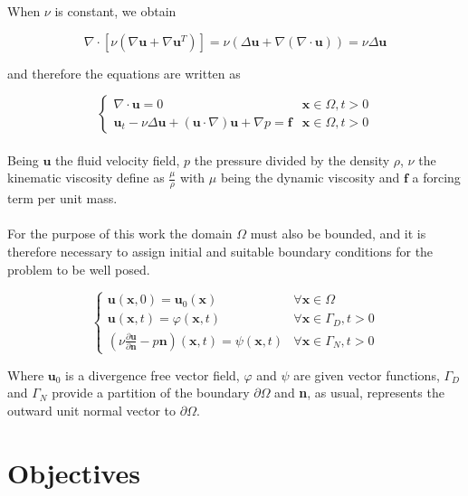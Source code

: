 \documentclass[12pt,letterpaper]{article}
\begin{document}
When $\nu$ is constant, we obtain

$$\nabla \cdot[\nu (\nabla \textbf{u} + \nabla \textbf{u}^T)] = \nu (\Delta \textbf{u} + \nabla(\nabla \cdot \textbf{u})) = \nu \Delta \textbf{u}$$

and therefore the equations are written as

\begin{equation}
  \begin{cases}
     \nabla \cdot \textbf{u} = 0 & \textbf{x} \in \Omega , t > 0\\
     
     \textbf{u}_t - \nu \Delta \textbf{u} + (\textbf{u}\cdot \nabla)
     \textbf{u}+ \nabla p = \textbf{f} & \textbf{x} \in \Omega , t > 0
  
  \end{cases}
  \label{2}
\end{equation}\\

Being $\textbf{u}$ the fluid velocity field, $p$ the pressure divided by the density $\rho$, $\nu$
the kinematic viscosity define as $\frac{\mu}{\rho}$ with $\mu$ being the dynamic viscosity and $\textbf{f}$ 
a forcing term per unit mass.\\~\\
For the purpose of this work the domain $\Omega$ must also be bounded, and it is therefore necessary 
to assign initial and suitable boundary conditions for the problem to be well posed.

$$\begin{cases}
  \textbf{u}(\textbf{x},0) = \textbf{u}_0(\textbf{x}) & \forall \textbf{x} \in \Omega \\
  \textbf{u}(\textbf{x},t) = \varphi(\textbf{x},t) & \forall \textbf{x}\in \varGamma_D, t>0 \\
  \left(\nu\frac{\partial \textbf{u}}{\partial \textbf{n}}-p\textbf{n}\right)(\textbf{x},t) = \psi(\textbf{x},t) & \forall \textbf{x}\in \varGamma_N, t>0

\end{cases}$$

Where $\textbf{u}_0$ is a divergence free vector field,  $\varphi$ and $\psi$ are given vector
functions, $\varGamma_D$ and $\varGamma_N$ provide a partition of the boundary $\partial \Omega$ and 
\textbf{n}, as usual, represents the outward unit normal vector to $\partial \Omega$.

\section{Objectives}
\end{document}

